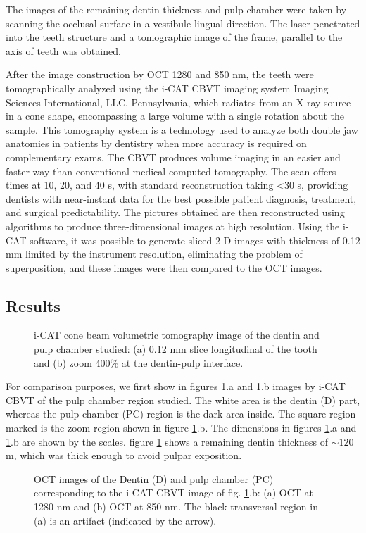 \documentclass[12pt,twoside,english]{book}
\renewcommand{\~}{\perispomeni}%
\DeclareRobustCommand{\textgreek}[1]{\leavevmode{\greektext #1}}
\numberwithin{equation}{section}
\numberwithin{figure}{section}
\begin{document}
The images of the remaining dentin thickness and pulp chamber were taken by scanning the occlusal surface in a vestibule-lingual direction. The laser penetrated into the teeth structure and a tomographic image of the frame, parallel to the axis of teeth was obtained. 

After the image construction by OCT 1280 and 850 nm, the teeth were tomographically analyzed using the i-CAT \gls{CBVT} imaging system Imaging Sciences International, LLC, Pennsylvania, which radiates from an X-ray source in a cone shape, encompassing a large volume with a single rotation about the sample. This tomography system is a technology used to analyze both double jaw anatomies in patients by dentistry when more accuracy is required on complementary exams. The CBVT produces volume imaging in an easier and faster way than conventional medical computed tomography\cite{Danforth:2003p2286}. The scan offers times at 10, 20, and 40 s, with standard reconstruction taking <30 s, providing dentists with near-instant data for the best possible patient diagnosis, treatment, and surgical predictability. The pictures obtained are then reconstructed using algorithms to produce three-dimensional images at high resolution. Using the i-CAT software, it was possible to generate sliced 2-D images with thickness of 0.12 mm limited by the instrument resolution, eliminating the problem of superposition, and these images were then compared to the OCT images. 

\subsection{Results}
\begin{figure}[h]
\centering{}
\caption{i-CAT cone beam volumetric tomography image of the dentin and pulp chamber studied: (a) 0.12 mm slice longitudinal of the tooth and (b) zoom 400\% at the dentin-pulp interface.\label{fig:i-CAT tomography}}
\end{figure}

For comparison purposes, we first show in figures \ref{fig:i-CAT tomography}.a and \ref{fig:i-CAT tomography}.b images by i-CAT CBVT of the pulp chamber region studied. The white area is the dentin (D) part, whereas the pulp chamber (PC) region is the dark area inside. The square region marked is the zoom region shown in figure \ref{fig:i-CAT tomography}.b. The dimensions in figures \ref{fig:i-CAT tomography}.a and \ref{fig:i-CAT tomography}.b are shown by the scales. figure \ref{fig:i-CAT tomography} shows a remaining dentin thickness of $\sim120$ \textgreek{m}m, which was thick enough to avoid pulpar exposition.
\begin{figure}[h]
\centering{}
\caption{OCT images of the Dentin (D) and pulp chamber (PC) corresponding to the i-CAT CBVT image of fig. \ref{fig:i-CAT tomography}.b: (a) OCT at 1280 nm and (b) OCT at 850 nm. The black transversal region in (a) is an artifact (indicated by the arrow).\label{fig:OCT dentin pulp chamber}}
\end{figure}
\end{document}
